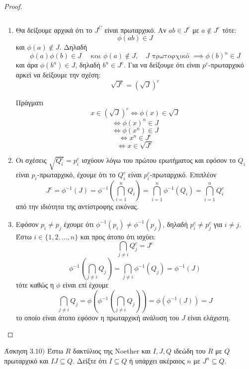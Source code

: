\documentclass[oneside,a4paper]{article}
\newcommand {\tl}{\textlatin}
\begin{document}
\begin{proof} $ $

	$ $\newline
	\begin{enumerate}
		\item Θα δείξουμε αρχικά ότι το $J^C$ είναι πρωταρχικό. Αν $ab \in J^c$ με $a \not\in J^c$ τότε:
		$$\phi(ab) \in J$$ και $\phi (a) \not\in J$. Δηλαδή
		$$\phi(a) \phi(b) \in J \quad\text{ και } \phi(a) \not\in J, \quad J \text{ πρωταρχικό } \implies \phi(b)^n \in J  $$
		και άρα $\phi (b^n) \in J$, δηλαδή $b^n \in J^c$. Για να δείξουμε ότι είναι $p^c$-πρωταρχικό αρκεί να δείξουμε την σχέση:
		$$\sqrt{J^c} = (\sqrt{J})^c$$

		Πράγματι
		$$x \in (\sqrt{J})^c \iff \phi(x) \in \sqrt J$$
		$$\iff \phi(x)^n \in J$$
		$$\iff \phi(x^n) \in J$$
		$$\iff x^n \in J^c$$
		$$\iff x \in \sqrt{J^c}$$

		\item Οι σχέσεις $\sqrt{Q^c_i} = p^c_i$ ισχύουν λόγω του πρώτου ερωτήματος και εφόσον το $Q_i$ είναι $p_i$-πρωταρχικό, έχουμε ότι το $Q^c_i$ είναι $p^c_i$-πρωταρχικό. Επιπλέον
		$$ J^c = \phi^{-1}(J) = \phi^{-1}\left(\bigcap\limits_{i=1}^n Q_i \right) = \bigcap\limits_{i=1}^n \phi^{-1}(Q_i) = \bigcap\limits_{i=1}^n Q^c_i$$
		από την ιδιότητα της αντίστροφης εικόνας.

		\item Εφόσον $p_i \neq p_j$ έχουμε ότι $\phi^{-1} (p_i) \neq \phi^{-1}(p_j)$, δηλαδή $p^c_i \neq p^c_j$ για $i\neq j$. Έστω $i \in \{1,2,\ldots,n\}$ και προς άτοπο ότι ισχύει:
		$$\bigcap\limits_{j\neq i} Q^c_j = J^c$$
		$$ \phi^{-1} \left( \bigcap\limits_{j\neq i} Q_j \right) = \bigcap\limits_{j\neq i} \phi^{-1}(Q_j) = \phi^{-1}(J)$$
		τότε καθώς η $\phi$ είναι επί έχουμε
		$$ \bigcap\limits_{j\neq i} Q_j = \phi \left( \phi^{-1} \left( \bigcap\limits_{j\neq i} Q_j \right) \right) = \phi \left( \phi^{-1}(J) \right) = J$$
		το οποίο είναι άτοπο εφόσον η πρωταρχική ανάλυση του $J$ είναι ελάχιστη.
	\end{enumerate}
	
\end{proof}

\pagebreak


\noindent Άσκηση $3.10)$
\quad Έστω $R$ δακτύλιος της \tl{Noether} και $I,J,Q$ ιδεώδη του $R$ με $Q$ πρωταρχικό και $IJ \subseteq Q$. Δείξτε ότι $I \subseteq Q$ ή υπάρχει ακέραιος $n$ με $J^n \subseteq Q$.
\end{document}
